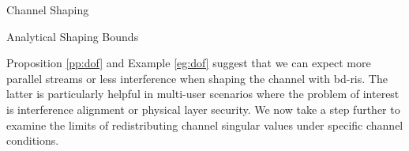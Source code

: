 \documentclass[journal]{IEEEtran}
\begin{document}
\begin{section}{Channel Shaping}
\begin{subsection}{Analytical Shaping Bounds}

		Proposition \ref{pp:dof} and Example \ref{eg:dof} suggest that we can expect more parallel streams or less interference when shaping the channel with \gls{bd}-\gls{ris}.
		The latter is particularly helpful in multi-user scenarios where the problem of interest is interference alignment or physical layer security.
		We now take a step further to examine the limits of redistributing channel singular values under specific channel conditions.


\end{subsection}
\end{section}
\end{document}
